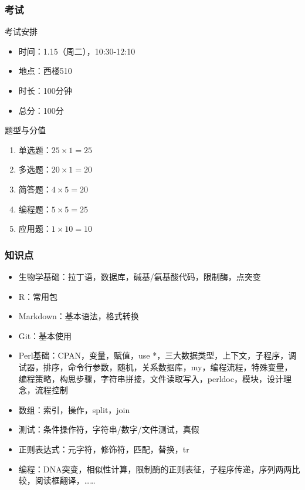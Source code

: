 \begin{frame}[plain]
\end{frame}

\begin{frame}
  \frametitle{考试}
  \begin{block}{考试安排}
    \begin{itemize}
      \item 时间：1.15（周二），10:30-12:10
      \item 地点：西楼510
      \item 时长：100分钟
      \item 总分：100分
    \end{itemize}
  \end{block}
  \pause
  \begin{block}{题型与分值}
    \begin{enumerate}
      \item 单选题：$25 \times 1  = 25$
      \item 多选题：$20 \times 1  = 20$
      \item 简答题：$4  \times 5  = 20$
      \item 编程题：$5  \times 5  = 25$
      \item 应用题：$1  \times 10 = 10$
    \end{enumerate}
  \end{block}
\end{frame}

\begin{frame}
  \frametitle{知识点}
  \begin{itemize}
    \item 生物学基础：拉丁语，数据库，碱基/氨基酸代码，限制酶，点突变
    \item R：常用包
    \item Markdown：基本语法，格式转换
    \item Git：基本使用
    \item Perl基础：CPAN，变量，赋值，use *，三大数据类型，上下文，子程序，调试器，排序，命令行参数，随机，关系数据库，my，编程流程，特殊变量，编程策略，构思步骤，字符串拼接，文件读取写入，perldoc，模块，设计理念，流程控制
    \item 数组：索引，操作，split，join
    \item 测试：条件操作符，字符串/数字/文件测试，真假
    \item 正则表达式：元字符，修饰符，匹配，替换，tr
    \item 编程：DNA突变，相似性计算，限制酶的正则表征，子程序传递，序列两两比较，阅读框翻译，……
  \end{itemize}
\end{frame}

